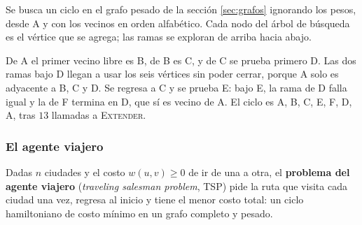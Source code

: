 \documentclass[11pt,letterpaper]{article}
\begin{document}
\begin{ejemplo}
  \label{ej:hamilton-traza}
  Se busca un ciclo en el grafo pesado de la sección \ref{sec:grafos}
  ignorando los pesos, desde A y con los vecinos en orden
  alfabético. Cada nodo del árbol de búsqueda es el vértice que se
  agrega; las ramas se exploran de arriba hacia abajo.
  \begin{center}
  \end{center}
  De A el primer vecino libre es B, de B es C, y de C se prueba
  primero D. Las dos ramas bajo D llegan a usar los seis vértices sin
  poder cerrar, porque A solo es adyacente a B, C y D. Se regresa a C
  y se prueba E: bajo E, la rama de D falla igual y la de F termina en
  D, que sí es vecino de A. El ciclo es A, B, C, E, F, D, A, tras $13$
  llamadas a \textsc{Extender}.
\end{ejemplo}


\subsubsection*{El agente viajero}

\begin{definicion}
  Dadas $n$ ciudades y el costo $w(u, v) \ge 0$ de ir de una a otra,
  el \textbf{problema del agente viajero} (\textit{traveling salesman
  problem}, TSP) pide la ruta que visita cada ciudad una vez, regresa
  al inicio y tiene el menor costo total: un ciclo hamiltoniano de
  costo mínimo en un grafo completo y pesado.
\end{definicion}
\end{document}
